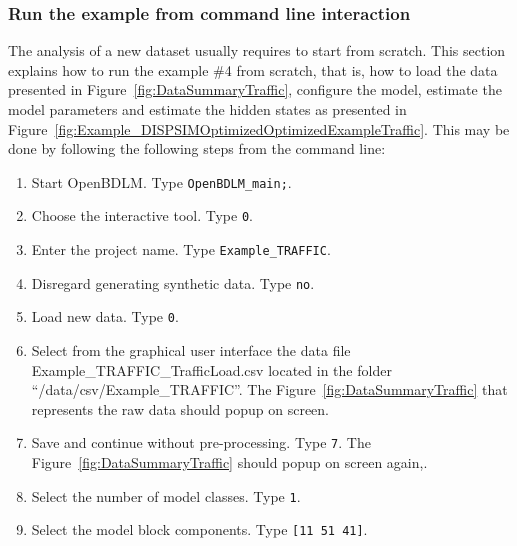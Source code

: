 \subsubsection{Run the example from command line interaction}

The analysis of a new dataset usually requires to start from scratch.
This section explains how to run the example \#4 from scratch, that is, how to load the data presented in Figure~\ref{fig:DataSummaryTraffic}, configure the model, estimate the model parameters and estimate the hidden states as presented in Figure~\ref{fig:Example_DISPSIMOptimizedOptimizedExampleTraffic}.
This may be done by following the following steps from the \MATLAB{} command line:
\begin{enumerate}
\item Start OpenBDLM. Type \colorbox{light-gray}{\lstinline[basicstyle = \mlttfamily \small, backgroundcolor = \color{light-gray}]!OpenBDLM_main;!}.
\item Choose the interactive tool. Type \colorbox{light-gray}{\lstinline[basicstyle = \mlttfamily \small, backgroundcolor = \color{light-gray}]!0!}.
\item Enter the project name. Type \colorbox{light-gray}{\lstinline[basicstyle = \mlttfamily \small, backgroundcolor = \color{light-gray}]!Example_TRAFFIC!}. 
\item Disregard generating synthetic data. Type \colorbox{light-gray}{\lstinline[basicstyle = \mlttfamily \small, backgroundcolor = \color{light-gray}]!no!}. 
\item Load new data. Type \colorbox{light-gray}{\lstinline[basicstyle = \mlttfamily \small, backgroundcolor = \color{light-gray}]!0!}.
\item Select from the graphical user interface the data file Example\_TRAFFIC\_TrafficLoad.csv located in the folder ``/data/csv/Example\_TRAFFIC''. The Figure~\ref{fig:DataSummaryTraffic} that represents the raw data should popup on screen.
\item Save and continue without pre-processing. Type \colorbox{light-gray}{\lstinline[basicstyle = \mlttfamily \small, backgroundcolor = \color{light-gray}]!7!}. The Figure~\ref{fig:DataSummaryTraffic} should popup on screen again,.
\item Select the number of model classes. Type \colorbox{light-gray}{\lstinline[basicstyle = \mlttfamily \small, backgroundcolor = \color{light-gray}]!1!}. 
\item Select the model block components. Type \colorbox{light-gray}{\lstinline[basicstyle = \mlttfamily \small, backgroundcolor = \color{light-gray}]![11 51 41]!}.

\end{enumerate}
